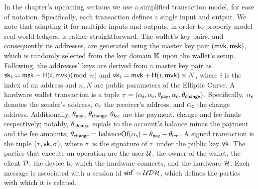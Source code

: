 In the chapter's upcoming sections we use a simplified transaction model, for
ease of notation. Specifically, each transaction defines a single input and
output. We note that adapting it for multiple inputs and outputs, in order to
properly model real-world ledgers, is rather straightforward. The wallet's key
pairs, and consequently its addresses, are generated using the master key pair
$(\mathsf{mvk}, \mathsf{msk})$, which is randomly selected from the key domain $\mathbb{K}$ upon
the wallet's setup. Following, the addresses' keys are derived from a master
key pair as $\mathsf{sk}_i = \mathsf{msk} + \mathsf{H}(i, \mathsf{mvk})(\bmod$ $n)$
and $\mathsf{vk}_i = \mathsf{mvk} + \mathsf{H}(i, \mathsf{mvk}) \times N$, where $i$
is the index of an address and $n, N$ are public parameters of the Elliptic
Curve. A hardware wallet transaction is a tuple $\tau = (\alpha_\mathsf{s},
\alpha_\mathsf{r}, \theta_\mathsf{pay}, \alpha_\mathsf{c},
\theta_\mathsf{change})$. Specifically, $\alpha_\mathsf{s}$ denotes the sender's
address, $\alpha_\mathsf{r}$ the receiver's address, and $\alpha_\mathsf{c}$ the
change address. Additionally, $\theta_\mathsf{pay}$, $\theta_\mathsf{change}$
$\theta_\mathsf{fee}$ are the payment, change and fee funds respectively;
notably, $\theta_\mathsf{change}$ equals to the account's balance minus the
payment and the fee amounts, \ie $\theta_\mathsf{change} =
\textrm{balanceOf}(\alpha_\mathsf{s}) - \theta_\mathsf{pay} -
\theta_\mathsf{fee}$. A signed transaction is the tuple $(\tau, \mathsf{vk}, \sigma)$,
where $\sigma$ is the signature of $\tau$ under the public key $\mathsf{vk}$.  The
parties that execute an operation are the user $\mathcal{U}$, \ie the owner of the
wallet, the client $\mathcal{D}$, \ie the device to which the hardware connects,
and the hardware $\mathcal{H}$. Each message is associated with a session id
$\mathsf{sid}' = \mathcal{U}\mathcal{D}\mathcal{H}$, which defines the parties with which it is
related.

